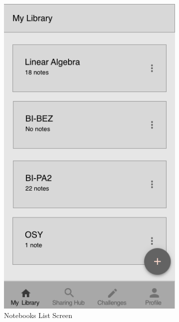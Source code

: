 \documentclass[thesis=B,english]{FITthesis}[2012/10/20]
\begin{document}
	\begin{figure}
 
\centering
\begin{subfigure}{.5\textwidth}
  \centering
  \includegraphics[scale=0.4]{Notebooks.png}
  \caption{Notebooks List Screen}
  \label{fig:notebooks}
\end{subfigure}%
\begin{subfigure}{.5\textwidth}
  \centering

\end{subfigure}
\end{figure}
\end{document}
